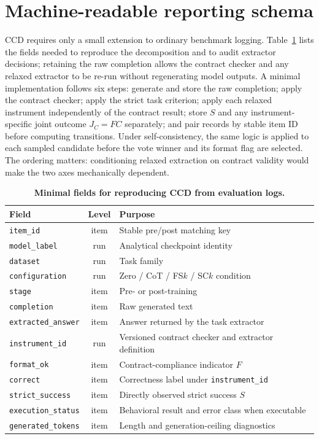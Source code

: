 \documentclass{article}
\newcommand{\ccd}{\textsc{CCD}}
\newcommand{\Jinst}{J_C}
\begin{document}
\section{Machine-readable reporting schema}
\label{app:schema}
\ccd{} requires only a small extension to ordinary benchmark logging.
Table~\ref{tab:schema} lists the fields needed to reproduce the decomposition
and to audit extractor decisions; retaining the raw completion allows the
contract checker and any relaxed extractor to be re-run without regenerating
model outputs. A minimal implementation follows six steps: generate and store
the raw completion; apply the contract checker; apply the strict task
criterion; apply each relaxed instrument independently of the contract
result; store $S$ and any instrument-specific joint outcome $\Jinst=FC$
separately; and pair records by stable item ID before computing transitions.
Under self-consistency, the same logic is applied to each sampled candidate
before the vote winner and its format flag are selected. The ordering matters:
conditioning relaxed extraction on contract validity would make the two axes
mechanically dependent.

\begin{table}[ht]
\centering
\small
\setlength{\tabcolsep}{6pt}
\begin{tabularx}{\linewidth}{@{}l c >{\raggedright\arraybackslash}X@{}}
\toprule
\textbf{Field} & \textbf{Level} & \textbf{Purpose}\\
\midrule
\texttt{item\_id}          & item & Stable pre/post matching key\\
\texttt{model\_label}      & run  & Analytical checkpoint identity\\
\texttt{dataset}           & run  & Task family\\
\texttt{configuration}     & run  & Zero / CoT / FS$k$ / SC$k$ condition\\
\texttt{stage}             & item & Pre- or post-training\\
\texttt{completion}        & item & Raw generated text\\
\texttt{extracted\_answer} & item & Answer returned by the task extractor\\
\texttt{instrument\_id}    & run  & Versioned contract checker and extractor definition\\
\texttt{format\_ok}        & item & Contract-compliance indicator $F$\\
\texttt{correct}           & item & Correctness label under \texttt{instrument\_id}\\
\texttt{strict\_success}   & item & Directly observed strict success $S$\\
\texttt{execution\_status} & item & Behavioral result and error class when executable\\
\texttt{generated\_tokens} & item & Length and generation-ceiling diagnostics\\
\bottomrule
\end{tabularx}
\caption{\textbf{Minimal fields for reproducing \ccd{} from evaluation logs.}}
\label{tab:schema}
\end{table}
\end{document}
